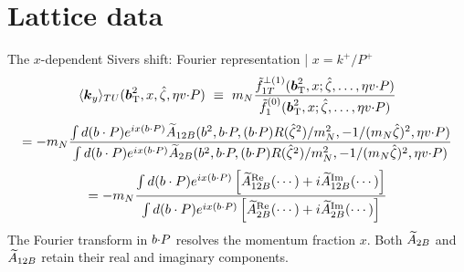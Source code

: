 \section{Lattice data}

\begin{frame}{The $x$-dependent Sivers shift: Fourier representation | $x=k^+/P^+$}
  \centering
  \[\resizebox{0.72\textwidth}{!}{$\displaystyle \langle \vect{k}_y \rangle_{TU}(\vprp{\bvec}^2,x,\zetahat,\eta v \tcdot P)
	\ \equiv\ \mN \frac{\tilde f_{1T}^{\perp(1)}(\vprp{\bvec}^2,x;\zetahat,\ldots,\eta v \tcdot P)}{\tilde f_1^{(0)}(\vprp{\bvec}^2,x;\zetahat,\ldots,\eta v \tcdot P)}  $}\]
  \[\resizebox{0.98\textwidth}{!}{$\displaystyle =-m_{N} \frac{\int d(b\cdot P)e^{ix(b\cdot P)} \tAmp_{12B}(\bvec^2,\bvec \tcdot P,(\bvec \tcdot P) R(\zetahat^2)/\mN^2,-1/(\mN\zetahat)^2,\eta v \tcdot P)}{\int d(b\cdot P)e^{ix(b\cdot P)}\tAmp_{2B}(\bvec^2,\bvec \tcdot P,(\bvec \tcdot P) R(\zetahat^2)/\mN^2,-1/(\mN\zetahat)^2,\eta v \tcdot P)}  $}\]
  \[\resizebox{0.68\textwidth}{!}{$\displaystyle =-m_{N} \frac{\int d(b\cdot P)e^{ix(b\cdot P)} \left[\tAmp_{12B}^{\text{Re}}(\cdots)+i\tAmp_{12B}^{\text{Im}}(\cdots)\right]}{\int d(b\cdot P)e^{ix(b\cdot P)}\left[\tAmp_{2B}^{\text{Re}}(\cdots)+i\tAmp_{2B}^{\text{Im}}(\cdots)\right]}$}\]
  \small
  The Fourier transform in $b{\cdot} P$ resolves the momentum fraction $x$.
  Both $\widetilde{A}_{2B}$ and $\widetilde{A}_{12B}$ retain their real and imaginary components.
\end{frame}

